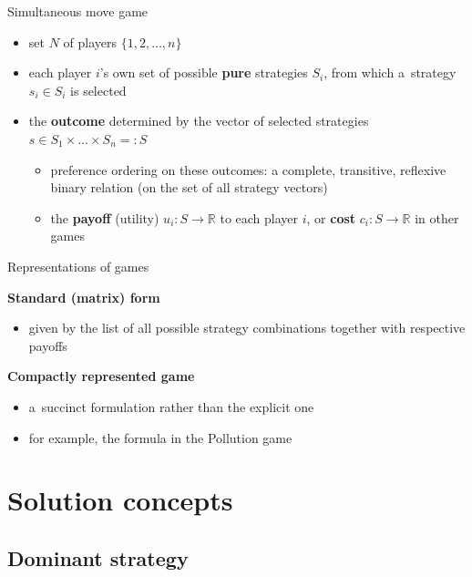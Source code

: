 \documentclass{beamer}
\newcommand{\R}{\mathbb{R}}
\begin{document}
\begin{frame}{Simultaneous move game}
  \begin{itemize}
      \pause
    \item set $N$ of players $\{1, 2, \dots, n\}$
      \pause
    \item each player $i$'s own set of possible {\bf pure} strategies $S_i$,
      from which a~strategy $s_i\in S_i$ is selected
      \pause
    \item the {\bf outcome} determined by the vector of selected strategies
      $s\in S_1\times\dots\times S_n =: S$
      \pause
      \begin{itemize}
        \item preference ordering on these outcomes: a complete, transitive,
          reflexive binary relation (on the set of all strategy vectors)
          \pause
        \item the {\bf payoff} (utility) $u_i:S\to \R$ to each player $i$, or
          {\bf cost} $c_i:S\to \R$ in other games
          \pause
      \end{itemize}
  \end{itemize}
\end{frame}

\begin{frame}{Representations of games}
  \pause

  {\bf Standard (matrix) form}
  \begin{itemize}
    \item given by the list of all possible strategy combinations together with
      respective payoffs
  \end{itemize}

  \pause
  {\bf Compactly represented game}
  \begin{itemize}
    \item a~succinct formulation rather than the explicit one
      \pause
    \item for example, the formula in the Pollution game
  \end{itemize}

\end{frame}

\section{Solution concepts}

\subsection{Dominant strategy}
\end{document}
